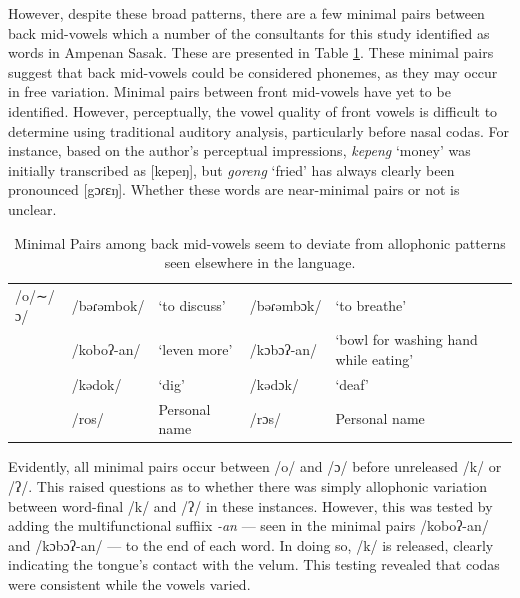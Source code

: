 \documentclass[12pt]{ouparticle}
\begin{document}
However, despite these broad patterns, there are a few  minimal pairs between back mid-vowels which a number of the consultants for this study identified as words in Ampenan Sasak. These are presented in Table \ref{tab:minimal_pairs}. These minimal pairs suggest that back mid-vowels could be considered phonemes, as they may occur in free variation. Minimal pairs between front mid-vowels have yet to be identified. However, perceptually, the vowel quality of front vowels is difficult to determine using traditional auditory analysis, particularly before nasal codas. For instance, based on the author's perceptual impressions, \textit{kepeng} `money' was initially transcribed as [kepeŋ], but \textit{goreng} `fried' has always clearly been pronounced [gɔɾɛŋ]. Whether these words are near-minimal pairs or not is unclear.

\begin{table}[ht]
\caption{Minimal Pairs among back mid-vowels seem to deviate from allophonic patterns seen elsewhere in the language.}
\label{tab:minimal_pairs}
\begin{tabular}{l|ll|ll}
/o/∼/ɔ/	& /bəɾəmbok/ & `to discuss' & /bəɾəmbɔk/ & `to           breathe'\\
        & 	/koboʔ-an/ &	`leven more'	&  /kɔbɔʔ-an/& `bowl for washing hand while eating’\\
        & /kədok/ & `dig' & /kədɔk/ & `deaf'\\
        & /ros/	& Personal name  & /rɔs/ & Personal name\\
\end{tabular}
\end{table}

Evidently, all minimal pairs occur between /o/ and /ɔ/ before unreleased /k/ or /ʔ/. This raised questions as to whether there was simply allophonic variation between word-final /k/ and /ʔ/ in these instances. However, this was tested by adding the multifunctional suffiix \textit{-an} --- seen in the minimal pairs /koboʔ-an/ and /kɔbɔʔ-an/ --- to the end of each word. In doing so, /k/ is released, clearly indicating the tongue's contact with the velum. This testing revealed that codas were consistent while the vowels varied. 
\end{document}
